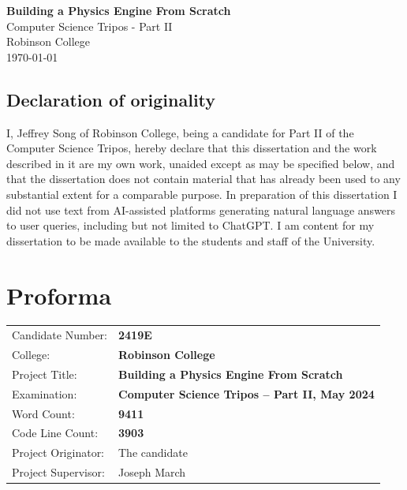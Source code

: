 \documentclass[12pt,a4paper,twoside,openright]{report}
\begin{document}

\pagestyle{empty}
\vspace*{60mm}
\begin{center}
\Huge
\textbf{Building a Physics Engine From Scratch} \\[5mm]
Computer Science Tripos - Part II \\[5mm]
Robinson College \\[5mm]
\today %
\end{center}

\newpage
\section*{Declaration of originality}
I, Jeffrey Song of Robinson College, being a candidate for Part II of the Computer Science Tripos, hereby declare that this dissertation and the work described in it are my own work, unaided except as may be specified below, and that the dissertation does not contain material that has already been used to any substantial extent for a comparable purpose. In preparation of this dissertation I did not use text from AI-assisted platforms generating natural language answers to user queries, including but not limited to ChatGPT. I am content for my dissertation to be made available to the students and staff of the University.
\bigskip
{}
\medskip
{}

\pagestyle{plain}
\chapter*{Proforma}
{\large
\begin{tabular}{ll}
Candidate Number: & \bf 2419E \\
College: & \bf Robinson College \\
Project Title: & \bf Building a Physics Engine From Scratch \\
Examination: & \bf Computer Science Tripos -- Part II, May 2024 \\
Word Count: & \bf 9411\footnotemark[1] \\
Code Line Count: & \bf3903\footnotemark[2] \\
Project Originator: & The candidate \\
Project Supervisor: & Joseph March \\
\end{tabular}
}
\end{document}
